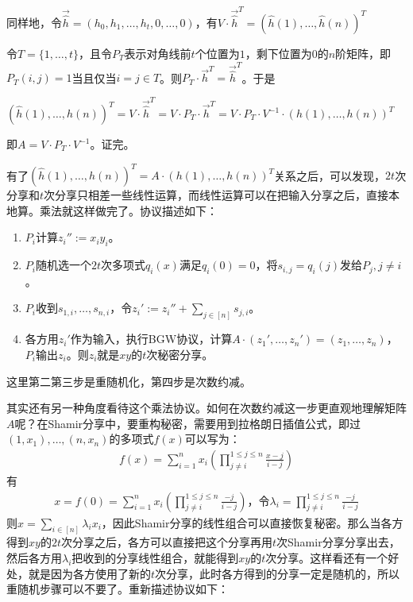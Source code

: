 \documentclass[UTF8]{ctexart}
\theoremstyle{nonumberplain}
\theoremstyle{plain}
\begin{document}
同样地，令$\vec{\hat{h}}=(h_0,h_1,\dots,h_t,0,\dots,0)$，有$V\cdot \vec{\hat{h}}^T=(\hat{h}(1),\dots,\hat{h}(n))^T$

令$T=\{1,\dots,t\}$，且令$P_T$表示对角线前$t$个位置为$1$，剩下位置为$0$的$n$阶矩阵，即$P_T(i,j)=1$当且仅当$i=j\in T$。则$P_T\cdot \vec{h}^T=\vec{\hat{h}}^T$。于是

$(\hat{h}(1),\dots,\hat{h}(n))^T=V\cdot \vec{\hat{h}}^T=V\cdot P_T\cdot \vec{h}^T=V\cdot P_T\cdot V^{-1}\cdot (h(1),\dots,h(n))^T$

即$A=V\cdot P_T\cdot V^{-1}$。证完。

有了$(\hat{h}(1),\dots,\hat{h}(n))^T=A\cdot (h(1),\dots,h(n))^T$关系之后，可以发现，$2t$次分享和$t$次分享只相差一些线性运算，而线性运算可以在把输入分享之后，直接本地算。乘法就这样做完了。协议描述如下：

\begin{enumerate}
\item $P_i$计算$z_i'':=x_iy_i$。
\item $P_i$随机选一个$2t$次多项式$q_i(x)$满足$q_i(0)=0$，将$s_{i,j}=q_i(j)$发给$P_j,j\ne i$。
\item $P_i$收到$s_{1,i},\dots,s_{n,i}$，令$z_i':=z_i''+\sum_{j\in [n]}s_{j,i}$。
\item 各方用$z_i'$作为输入，执行BGW协议，计算$A\cdot (z_1',\dots,z_n')=(z_1,\dots,z_n)$，$P_i$输出$z_i$。则$z_i$就是$xy$的$t$次秘密分享。
\end{enumerate}

这里第二第三步是重随机化，第四步是次数约减。

其实还有另一种角度看待这个乘法协议。如何在次数约减这一步更直观地理解矩阵$A$呢？在Shamir分享中，要重构秘密，需要用到拉格朗日插值公式，即过$(1,x_1),\dots,(n,x_n)$的多项式$f(x)$可以写为：
\begin{align*}
f(x)=\sum_{i=1}^nx_i(\prod_{j\ne i}^{1\leq j\leq n}\frac{x-j}{i-j})
\end{align*}有
\begin{align*}
x=f(0)=\sum_{i=1}^nx_i(\prod_{j\ne i}^{1\leq j\leq n}\frac{-j}{i-j})\text{，令}\lambda_i=\prod_{j\ne i}^{1\leq j\leq n}\frac{-j}{i-j}
\end{align*}
则$x=\sum_{i\in [n]} \lambda_ix_i$，因此Shamir分享的线性组合可以直接恢复秘密。那么当各方得到$xy$的$2t$次分享之后，各方可以直接把这个分享再用$t$次Shamir分享分享出去，然后各方用$\lambda_i$把收到的分享线性组合，就能得到$xy$的$t$次分享。这样看还有一个好处，就是因为各方使用了新的$t$次分享，此时各方得到的分享一定是随机的，所以重随机步骤可以不要了。重新描述协议如下：
\end{document}
